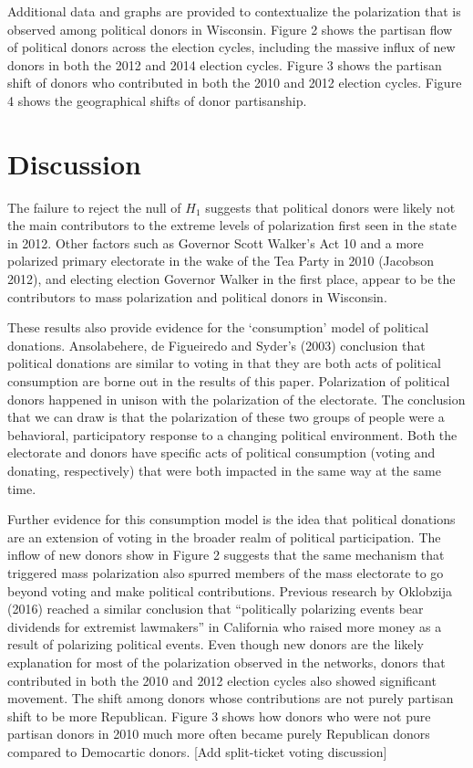 \documentclass[12pt,]{article}
\begin{document}
Additional data and graphs are provided to contextualize the
polarization that is observed among political donors in Wisconsin.
Figure 2 shows the partisan flow of political donors across the election
cycles, including the massive influx of new donors in both the 2012 and
2014 election cycles. Figure 3 shows the partisan shift of donors who
contributed in both the 2010 and 2012 election cycles. Figure 4 shows
the geographical shifts of donor partisanship.

\hypertarget{discussion}{%
\section{Discussion}\label{discussion}}

The failure to reject the null of \(H_{1}\) suggests that political
donors were likely not the main contributors to the extreme levels of
polarization first seen in the state in 2012. Other factors such as
Governor Scott Walker's Act 10 and a more polarized primary electorate
in the wake of the Tea Party in 2010 (Jacobson 2012), and electing
election Governor Walker in the first place, appear to be the
contributors to mass polarization and political donors in Wisconsin.

These results also provide evidence for the `consumption' model of
political donations. Ansolabehere, de Figueiredo and Syder's (2003)
conclusion that political donations are similar to voting in that they
are both acts of political consumption are borne out in the results of
this paper. Polarization of political donors happened in unison with the
polarization of the electorate. The conclusion that we can draw is that
the polarization of these two groups of people were a behavioral,
participatory response to a changing political environment. Both the
electorate and donors have specific acts of political consumption
(voting and donating, respectively) that were both impacted in the same
way at the same time.

Further evidence for this consumption model is the idea that political
donations are an extension of voting in the broader realm of political
participation. The inflow of new donors show in Figure 2 suggests that
the same mechanism that triggered mass polarization also spurred members
of the mass electorate to go beyond voting and make political
contributions. Previous research by Oklobzija (2016) reached a similar
conclusion that ``politically polarizing events bear dividends for
extremist lawmakers'' in California who raised more money as a result of
polarizing political events. Even though new donors are the likely
explanation for most of the polarization observed in the networks,
donors that contributed in both the 2010 and 2012 election cycles also
showed significant movement. The shift among donors whose contributions
are not purely partisan shift to be more Republican. Figure 3 shows how
donors who were not pure partisan donors in 2010 much more often became
purely Republican donors compared to Democartic donors. {[}Add
split-ticket voting discussion{]}
\end{document}
